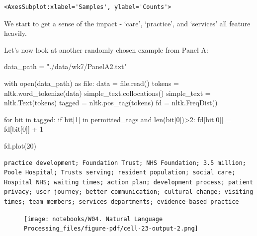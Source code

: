 \documentclass[
  letterpaper,
  DIV=11,
  numbers=noendperiod]{scrreprt}
\newenvironment{Shaded}{\begin{snugshade}}{\end{snugshade}}
\newcommand{\BuiltInTok}[1]{\textcolor[rgb]{0.00,0.23,0.31}{#1}}
\newcommand{\ControlFlowTok}[1]{\textcolor[rgb]{0.00,0.23,0.31}{#1}}
\newcommand{\DecValTok}[1]{\textcolor[rgb]{0.68,0.00,0.00}{#1}}
\newcommand{\ImportTok}[1]{\textcolor[rgb]{0.00,0.46,0.62}{#1}}
\newcommand{\KeywordTok}[1]{\textcolor[rgb]{0.00,0.23,0.31}{#1}}
\newcommand{\NormalTok}[1]{\textcolor[rgb]{0.00,0.23,0.31}{#1}}
\newcommand{\OperatorTok}[1]{\textcolor[rgb]{0.37,0.37,0.37}{#1}}
\newcommand{\StringTok}[1]{\textcolor[rgb]{0.13,0.47,0.30}{#1}}
\begin{document}
\begin{verbatim}
<AxesSubplot:xlabel='Samples', ylabel='Counts'>
\end{verbatim}

We start to get a sense of the impact - `care', `practice', and
`services' all feature heavily.

Let's now look at another randomly chosen example from Panel A:

\begin{Shaded}
\begin{Highlighting}[]
\NormalTok{data\_path }\OperatorTok{=} \StringTok{"./data/wk7/PanelA2.txt"}

\ControlFlowTok{with} \BuiltInTok{open}\NormalTok{(data\_path) }\ImportTok{as} \BuiltInTok{file}\NormalTok{:}
\NormalTok{    data }\OperatorTok{=} \BuiltInTok{file}\NormalTok{.read()}
\NormalTok{tokens }\OperatorTok{=}\NormalTok{ nltk.word\_tokenize(data)}
\NormalTok{simple\_text.collocations()}
\NormalTok{simple\_text }\OperatorTok{=}\NormalTok{ nltk.Text(tokens)}
\NormalTok{tagged }\OperatorTok{=}\NormalTok{ nltk.pos\_tag(tokens)}
\NormalTok{fd }\OperatorTok{=}\NormalTok{ nltk.FreqDist()}

\ControlFlowTok{for}\NormalTok{ bit }\KeywordTok{in}\NormalTok{ tagged:}
    \ControlFlowTok{if}\NormalTok{ bit[}\DecValTok{1}\NormalTok{] }\KeywordTok{in}\NormalTok{ permitted\_tags }\KeywordTok{and} \BuiltInTok{len}\NormalTok{(bit[}\DecValTok{0}\NormalTok{])}\OperatorTok{\textgreater{}}\DecValTok{2}\NormalTok{:}
\NormalTok{        fd[bit[}\DecValTok{0}\NormalTok{]] }\OperatorTok{=}\NormalTok{ fd[bit[}\DecValTok{0}\NormalTok{]] }\OperatorTok{+} \DecValTok{1}
        
\NormalTok{fd.plot(}\DecValTok{20}\NormalTok{)}
\end{Highlighting}
\end{Shaded}

\begin{verbatim}
practice development; Foundation Trust; NHS Foundation; 3.5 million;
Poole Hospital; Trusts serving; resident population; social care;
Hospital NHS; waiting times; action plan; development process; patient
privacy; user journey; better communication; cultural change; visiting
times; team members; services departments; evidence-based practice
\end{verbatim}

\begin{figure}[H]

{\centering \texttt{[image: notebooks/W04. Natural Language Processing\_files/figure-pdf/cell-23-output-2.png]}

}

\end{figure}
\end{document}
